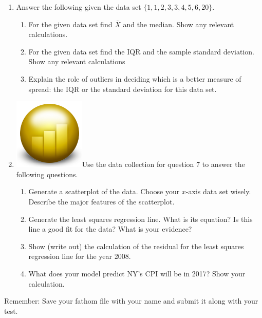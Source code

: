 \documentclass[12pt]{article}
\theoremstyle{plain}     %
\begin{document}
\begin{enumerate}
\begin{enumerate}
		\end{enumerate}
		\item Answer the following given the data set $\{1,1,2,3,3,4,5,6,20\}$.
			\begin{enumerate}
				\item For the given data set find $\overline{X}$ and the median. Show any relevant calculations.\\[1cm]
				\item For the given data set find the IQR and the sample standard deviation. Show any relevant calculations\\[1cm]
				\item Explain the role of outliers in deciding which is a better measure of spread: the IQR or the standard deviation for this data set.
			\end{enumerate}
			
		\newpage
		\item \includegraphics[scale=.1]{fathom.png}Use the data collection for question 7 to answer the following questions.
			\begin{enumerate}
				\item Generate a scatterplot of the data. Choose your $x$-axis data set wisely. Describe the major features of the scatterplot.\\[4cm]
				\item Generate the least squares regression line. What is its equation? Is this line a good fit for the data? What is your evidence?\\[4cm]
				\item Show (write out) the calculation of the residual for the least squares regression line for the year 2008.\\[2cm]
				\item What does your model predict NY's CPI will be in 2017? Show your calculation.
			\end{enumerate}
\end{enumerate}
\vfill Remember: Save your fathom file with your name and submit it along with your test.	
\end{document}
